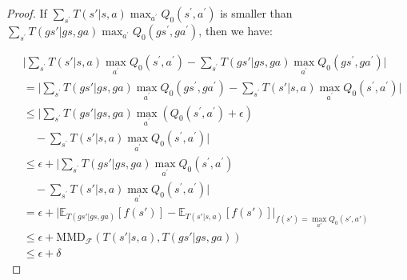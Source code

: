 \documentclass[letterpaper]{article} %
\theoremstyle{definition}
\begin{document}
\begin{proof}
If $\sum_{s^{\prime}} T(s'|s, a)  \max_{a^{\prime}} Q_0(s^{\prime}, a^{\prime})$  is smaller than $\sum_{s^{\prime}} T(gs'|gs, ga)  \max_{a^{\prime}} Q_0(gs^{\prime}, ga^{\prime})$, then we have:

{\scriptsize
\begin{equation*}
\begin{aligned}
&   \Biggl |\sum_{s^{\prime}} T(s'|s, a)  \max_{a^{\prime}} Q_0(s^{\prime}, a^{\prime})  -  \sum_{s^{\prime}} T(gs'|gs, ga)  \max_{a^{\prime}} Q_0(gs^{\prime}, ga^{\prime}) \Biggl | \\
& = \Biggl | \sum_{s^{\prime}} T(gs'|gs, ga)  \max_{a^{\prime}} Q_0(gs^{\prime}, ga^{\prime})  -  \sum_{s^{\prime}} T(s'|s, a)  \max_{a^{\prime}} Q_0(s^{\prime}, a^{\prime}) \Biggl | \\
& \leq \Biggl | \sum_{s^{\prime}} T(gs'|gs, ga)  \max_{a^{\prime}} (Q_0(s^{\prime}, a^{\prime}) +\epsilon) \\
& \quad  -  \sum_{s^{\prime}} T(s'|s, a)  \max_{a^{\prime}} Q_0(s^{\prime}, a^{\prime}) \Biggl | \\
& \leq \epsilon  + \Biggl | \sum_{s^{\prime}} T(gs'|gs, ga)  \max_{a^{\prime}} Q_0(s^{\prime}, a^{\prime}) \\
& \quad  -  \sum_{s^{\prime}} T(s'|s, a)  \max_{a^{\prime}} Q_0(s^{\prime}, a^{\prime}) \Biggl | \\
& = \epsilon + \Biggl | \mathbb{E}_{T(gs'|gs, ga)}[f(s')] - \mathbb{E}_{T(s'|s, a)}[f(s')]  \Biggl |_{f(s')=\max_{a'} Q_0(s', a')}\\
& \leq \epsilon + \text{MMD}_{\mathcal{F}} \left(T(s'|s, a), T(gs'|gs, ga)\right) \\
& \leq \epsilon + \delta
\end{aligned}
\end{equation*}}


\end{proof}
\end{document}
